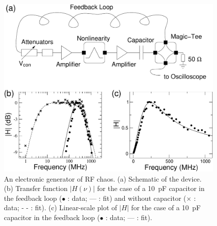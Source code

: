 \documentclass[aps,twocolumn,pre,nofootinbib]{revtex4}
\begin{document}
%
% 
\begin{figure}
\includegraphics*[width= 1.6 \columnwidth]{Fig2} 
\caption{An electronic generator of RF chaos. (a)  Schematic of the device.
 (b) Transfer function $|H(\nu)|$ for the case of a 10~pF capacitor in the feedback loop ($\bullet$ : data; --- : fit) and without capacitor ($\times$ : data; - - : fit). (c) Linear-scale plot of $|H|$ for the case of a 10~pF capacitor in the feedback loop ($\bullet$ : data; --- : fit).
}
\label{fig:setup}
\end{figure}
\end{document}
